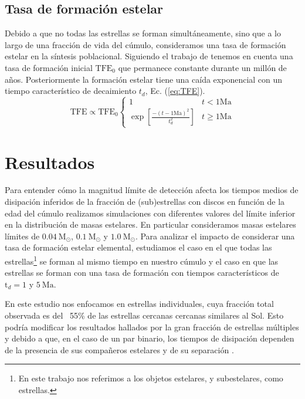 \documentclass[baaa]{baaa}
\begin{document}
\subsection{Tasa de formación estelar}

Debido a que no todas las estrellas se forman simult\'aneamente, sino que a lo largo de una fracci\'on de vida del c\'umulo, consideramos una tasa de formación estelar en la s\'intesis poblacional. Siguiendo el trabajo de \cite{coleman2022dispersal} tenemos en cuenta una tasa de formación inicial $\mathrm{TFE}_{0}$ que permanece constante durante un millón de años. Posteriormente la formación estelar tiene una caída exponencial con un tiempo característico de decaimiento $t_{d}$, Ec. (\ref{eq:TFE}). 
\begin{equation}     \label{eq:TFE}
    \mathrm{TFE} \propto \mathrm{TFE}_{0} 
      \begin{cases}
           1 & t <  \mathrm{1 Ma} \\ 
          \exp \left[ \frac{-(t- \mathrm{1 Ma})^{2}}{t^{2}_{d}} \right] & t \geq \mathrm{1 Ma}
      \end{cases}
\end{equation}

\section{Resultados}

Para entender cómo la magnitud límite de detección afecta los tiempos medios de disipación inferidos de la fracción de (sub)estrellas con discos en función de la edad del cúmulo realizamos simulaciones con diferentes valores del límite inferior en la distribución de masas estelares. En particular consideramos masas estelares límites de $0.04~\mathrm{M}_{\odot}$, $0.1~\mathrm{M}_{\odot}$ y $1.0~\mathrm{M}_{\odot}$. Para analizar el impacto de considerar una tasa de formación estelar elemental, estudiamos el caso en el que todas las estrellas\footnote{En este trabajo nos referimos a los objetos estelares, y subestelares, como estrellas.} se forman al mismo tiempo en nuestro c\'umulo y el caso en que las estrellas se forman con una tasa de formación con tiempos característicos de $\mathrm{t}_{d} =1$ y $5~\mathrm{Ma}$. 

En este estudio nos enfocamos en estrellas individuales, cuya fracción total observada es del ~55\% \citep{Raghavan_2010} de las estrellas cercanas cercanas similares al Sol. Esto podría modificar los resultados hallados por la gran fracción de estrellas múltiples y debido a que, en el caso de un par binario, los tiempos de disipación dependen de la presencia de sus compañeros estelares y de su separación \cite{2012Krous}.
\end{document}
